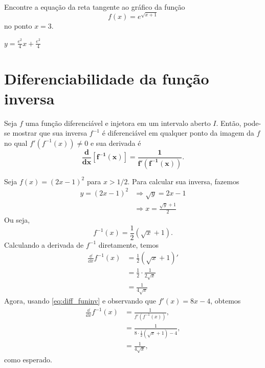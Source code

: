 \begin{exer}
  Encontre a equação da reta tangente ao gráfico da função
  \begin{equation}
    f(x) = e^{\sqrt{x+1}}
  \end{equation}
  no ponto $x=3$.
\end{exer}
\begin{resp}
  $y = \frac{e^2}{4}x + \frac{e^2}{4}$
\end{resp}

\section{Diferenciabilidade da função inversa}\label{cap_deriv_sec_funinv}

Seja $f$ uma função diferenciável e injetora em um intervalo aberto $I$. Então, pode-se mostrar que sua inversa $f^{-1}$ é diferenciável em qualquer ponto da imagem da $f$ no qual $f'(f^{-1}(x))\neq 0$ e sua derivada é
\begin{equation}\label{eq:diff_funinv}
  \pmb{\frac{d}{dx}[f^{-1}(x)] = \frac{1}{f'(f^{-1}(x))}}.
\end{equation}

\begin{ex}
  Seja $f(x) = (2x-1)^2$ para $x>1/2$. Para calcular sua inversa, fazemos
  \begin{align}
    y = (2x-1)^2 &\Rightarrow \sqrt{y} = 2x-1\\
               &\Rightarrow x = \frac{\sqrt{y}+1}{2}
  \end{align}
  Ou seja,
  \begin{equation}
    f^{-1}(x) = \frac{1}{2}(\sqrt{x}+1).
  \end{equation}
  Calculando a derivada de $f^{-1}$ diretamente, temos
  \begin{align}
    \frac{\dd}{\dd x}f^{-1}(x) &= \frac{1}{2}\left(\sqrt{x}+1\right)' \\
                               &= \frac{1}{2}\cdot\frac{1}{2\sqrt{x}} \\
                               &= \frac{1}{4\sqrt{x}}
  \end{align}
  Agora, usando \eqref{eq:diff_funinv} e observando que $f'(x) = 8x-4$, obtemos
  \begin{align}
    \frac{\dd}{\dd x}f^{-1}(x) &= \frac{1}{f'(f^{-1}(x))},\\
                               &= \frac{1}{8\cdot \frac{1}{2}\left(\sqrt{x}+1\right)-4}, \\
                               &= \frac{1}{4\sqrt{x}},
  \end{align}
  como esperado.
\end{ex}

